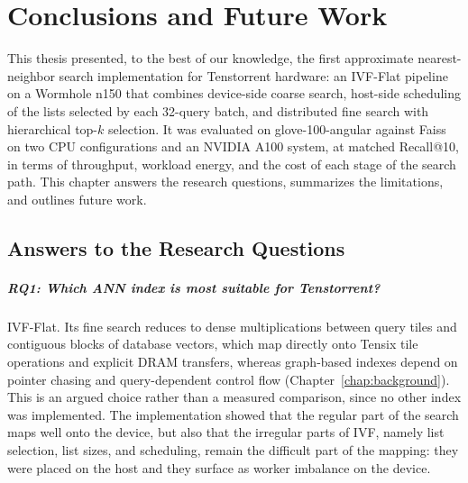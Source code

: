\chapter{Conclusions and Future Work}
\label{chap:conclusions}

This thesis presented, to the best of our knowledge, the first approximate
nearest-neighbor search implementation for Tenstorrent hardware: an IVF-Flat
pipeline on a Wormhole n150 that combines device-side coarse search, host-side
scheduling of the lists selected by each 32-query batch, and distributed fine
search with hierarchical top-\(k\) selection. It was evaluated on
glove-100-angular against Faiss on two CPU configurations and an NVIDIA A100
system, at matched Recall@10, in terms of throughput, workload energy, and the
cost of each stage of the search path. This chapter answers the research
questions, summarizes the limitations, and outlines future work.

\section{Answers to the Research Questions}
\label{sec:rq-answers}

\paragraph{RQ1: Which ANN index is most suitable for Tenstorrent?}
IVF-Flat. Its fine search reduces to dense multiplications between query tiles
and contiguous blocks of database vectors, which map directly onto Tensix tile
operations and explicit DRAM transfers, whereas graph-based indexes depend on
pointer chasing and query-dependent control flow
(Chapter~\ref{chap:background}). This is an argued choice rather than a
measured comparison, since no other index was implemented. The implementation
showed that the regular part of the search maps well onto the device, but also that the irregular parts of
IVF, namely list selection, list sizes, and scheduling, remain the difficult
part of the mapping: they were placed on the host and they surface as worker
imbalance on the device.

